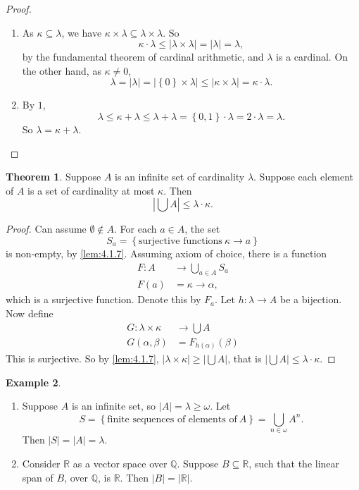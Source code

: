 \documentclass{article}
\newcommand{\Q}{\mathbb{Q}}
\newcommand{\R}{\mathbb{R}}
\newcommand{\rb}[1]{\left( #1 \right)}
\newcommand{\cb}[1]{\left\{ #1 \right\}}
\newcommand{\abs}[1]{\left\lvert #1 \right\rvert}
\theoremstyle{definition}\newtheorem{definition}{Definition}[subsection]
\theoremstyle{definition}\newtheorem{remark1}[definition]{Remark}
\theoremstyle{definition}\newtheorem{example1}[definition]{Example}
\theoremstyle{definition}\newtheorem*{remark2}{Remark}
\theoremstyle{definition}\newtheorem*{example2}{Example}
\theoremstyle{definition}\newtheorem*{note}{Note}
\theoremstyle{definition}\newtheorem*{notation}{Notation}
\newtheorem{theorem}[definition]{Theorem}
\begin{document}
\begin{proof}
\hfill
\begin{enumerate}
\item As $ \kappa \subseteq \lambda $, we have $ \kappa \times \lambda \subseteq \lambda \times \lambda $. So
$$ \kappa \cdot \lambda \le \abs{\lambda \times \lambda} = \abs{\lambda} = \lambda, $$
by the fundamental theorem of cardinal arithmetic, and $ \lambda $ is a cardinal. On the other hand, as $ \kappa \ne 0 $,
$$ \lambda = \abs{\lambda} = \abs{\cb{0} \times \lambda} \le \abs{\kappa \times \lambda} = \kappa \cdot \lambda. $$
\item By $ 1 $,
$$ \lambda \le \kappa + \lambda \le \lambda + \lambda = \cb{0, 1} \cdot \lambda = 2 \cdot \lambda = \lambda. $$
So $ \lambda = \kappa + \lambda $.
\end{enumerate}
\end{proof}

\pagebreak

\begin{theorem}
\label{thm:4.2.6}
Suppose $ A $ is an infinite set of cardinality $ \lambda $. Suppose each element of $ A $ is a set of cardinality at most $ \kappa $. Then
$$ \abs{\bigcup A} \le \lambda \cdot \kappa. $$
\end{theorem}

\begin{proof}
Can assume $ \emptyset \notin A $. For each $ a \in A $, the set
$$ S_a = \cb{\text{surjective functions} \ \kappa \to a} $$
is non-empty, by \ref{lem:4.1.7}. Assuming axiom of choice, there is a function
\begin{align*}
F : A & \to \bigcup_{a \in A} S_a \\
F\rb{a} & = \kappa \to \alpha,
\end{align*}
which is a surjective function. Denote this by $ F_a $. Let $ h : \lambda \to A $ be a bijection. Now define
\begin{align*}
G : \lambda \times \kappa & \to \bigcup A \\
G\rb{\alpha, \beta} & = F_{h\rb{\alpha}}\rb{\beta}
\end{align*}
This is surjective. So by \ref{lem:4.1.7}, $ \abs{\lambda \times \kappa} \ge \abs{\bigcup A} $, that is $ \abs{\bigcup A} \le \lambda \cdot \kappa $.
\end{proof}

\begin{example1}
\hfill
\begin{enumerate}
\item Suppose $ A $ is an infinite set, so $ \abs{A} = \lambda \ge \omega $. Let
$$ S = \cb{\text{finite sequences of elements of} \ A} = \bigcup_{n \in \omega} A^n. $$
Then $ \abs{S} = \abs{A} = \lambda $.
\item Consider $ \R $ as a vector space over $ \Q $. Suppose $ B \subseteq \R $, such that the linear span of $ B $, over $ \Q $, is $ \R $. Then $ \abs{B} = \abs{\R} $.
\end{enumerate}
\end{example1}
\end{document}
